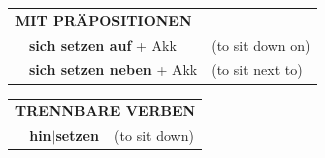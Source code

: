 \documentclass[10pt,a4paper]{revtex4-2}
\begin{document}
\begin{verbbox}
\vspace{10pt}

\begin{tabular}{lll}
\multicolumn{3}{l}{\textbf{MIT PRÄPOSITIONEN}}\\
& \textbf{sich setzen auf} + Akk & (to sit down on)\\
& \textbf{sich setzen neben} + Akk & (to sit next to)\\
\end{tabular}
\hfill
\begin{tabular}{lll}
\multicolumn{3}{l}{\textbf{TRENNBARE VERBEN}}\\
& \textbf{hin$|$setzen} & (to sit down)\\
\end{tabular}
\vspace{-5pt}
\end{verbbox}
\end{document}
